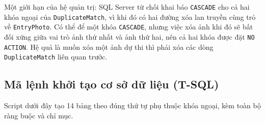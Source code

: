Một giới hạn của hệ quản trị: SQL Server từ chối khai báo \texttt{CASCADE} cho cả hai khóa ngoại của \texttt{DuplicateMatch}, vì khi đó có hai đường xóa lan truyền cùng trỏ về \texttt{EntryPhoto}. Có thể để một khóa \texttt{CASCADE}, nhưng việc xóa ảnh khi đó sẽ bất đối xứng giữa vai trò ảnh thứ nhất và ảnh thứ hai, nên cả hai khóa được đặt \texttt{NO ACTION}. Hệ quả là muốn xóa một ảnh dự thi thì phải xóa các dòng \texttt{DuplicateMatch} liên quan trước.

\subsection{Mã lệnh khởi tạo cơ sở dữ liệu (T-SQL)}

Script dưới đây tạo 14 bảng theo đúng thứ tự phụ thuộc khóa ngoại, kèm toàn bộ ràng buộc và chỉ mục.



